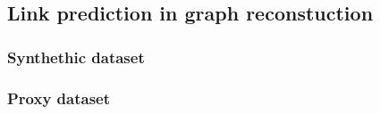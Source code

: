 
\subsection{Link prediction in graph reconstuction}


\subsubsection{Synthethic dataset}


\subsubsection{Proxy dataset}

